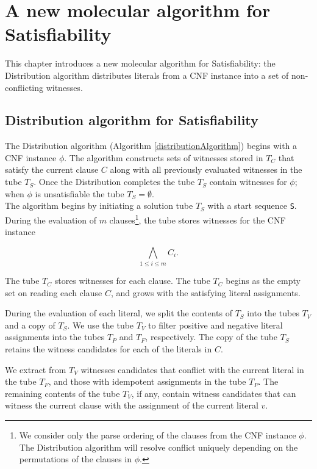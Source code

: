 
\chapter{A new molecular algorithm for {\sc Satisfiability}}

This chapter introduces a new molecular algorithm for {\sc Satisfiability}: the Distribution algorithm distributes literals from a CNF instance into a set of non-conflicting witnesses. 

\section{Distribution algorithm for {\sc Satisfiability}}


The Distribution algorithm (Algorithm \ref{distributionAlgorithm}) begins with a CNF instance $\phi$.  The algorithm constructs sets of witnesses stored in $T_C$ that satisfy the current clause $C$ along with all previously evaluated witnesses in the tube $T_S$.  Once the Distribution completes the tube $T_S$ contain witnesses for $\phi$; when $\phi$ is unsatisfiable the tube $T_S = \emptyset$. \\

The algorithm begins by initiating a solution tube $T_S$ with a start sequence \texttt{S}.  During the evaluation of $m$ clauses\footnote{We consider only the parse ordering of the clauses from the CNF instance $\phi$.  The Distribution algorithm will resolve conflict uniquely depending on the permutations of the clauses in $\phi$.}, the tube stores witnesses for the CNF instance

\[
\bigwedge_{1\leq i \leq m} C_i.
\]

The tube $T_C$ stores witnesses for each clause.  The tube $T_C$ begins as the empty set on reading each clause $C$, and grows with the satisfying literal assignments.  

During the evaluation of each literal, we split the contents of $T_S$ into the tubes $T_V$ and a copy of $T_S$.  We use the tube $T_V$ to filter positive and negative literal assignments into the tubes $T_P$ and $T_F$, respectively.  The copy of the tube $T_S$ retains the witness candidates for each of the literals in $C$.

We extract from $T_V$ witnesses candidates that conflict with the current literal in the tube $T_F$, and those with idempotent assignments in the tube $T_P$.  The remaining contents of the tube $T_V$, if any, contain witness candidates that can witness the current clause with the assignment of the current literal $v$.  

